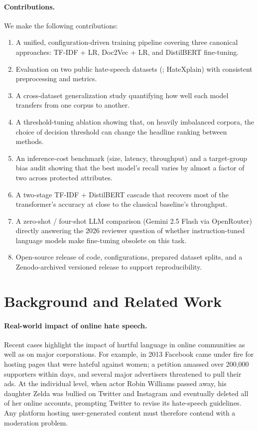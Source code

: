 \documentclass[11pt]{article}
\begin{document}
\paragraph{Contributions.} We make the following contributions:
\begin{enumerate}
  \item A unified, configuration-driven training pipeline covering three
        canonical approaches: TF-IDF + LR, Doc2Vec + LR, and DistilBERT
        fine-tuning.
  \item Evaluation on two public hate-speech datasets
        (\citealp{davidson2017automated}; HateXplain) with consistent
        preprocessing and metrics.
  \item A cross-dataset generalization study quantifying how well each model
        transfers from one corpus to another.
  \item A threshold-tuning ablation showing that, on heavily imbalanced
        corpora, the choice of decision threshold can change the headline
        ranking between methods.
  \item An inference-cost benchmark (size, latency, throughput) and a
        target-group bias audit showing that the best model's recall
        varies by almost a factor of two across protected attributes.
  \item A two-stage TF-IDF + DistilBERT cascade that recovers most of the
        transformer's accuracy at close to the classical baseline's
        throughput.
  \item A zero-shot / four-shot LLM comparison (Gemini 2.5 Flash via
        OpenRouter) directly answering the 2026 reviewer question of whether
        instruction-tuned language models make fine-tuning obsolete on this
        task.
  \item Open-source release of code, configurations, prepared dataset
        splits, and a Zenodo-archived versioned release to support
        reproducibility.
\end{enumerate}

\section{Background and Related Work}

\paragraph{Real-world impact of online hate speech.}
Recent cases highlight the impact of hurtful language in online communities
as well as on major corporations. For example, in 2013 Facebook came under
fire for hosting pages that were hateful against women; a petition amassed
over 200{,}000 supporters within days, and several major advertisers
threatened to pull their ads. At the individual level, when actor Robin
Williams passed away, his daughter Zelda was bullied on Twitter and
Instagram and eventually deleted all of her online accounts, prompting
Twitter to revise its hate-speech guidelines. Any platform hosting
user-generated content must therefore contend with a moderation problem.
\end{document}
